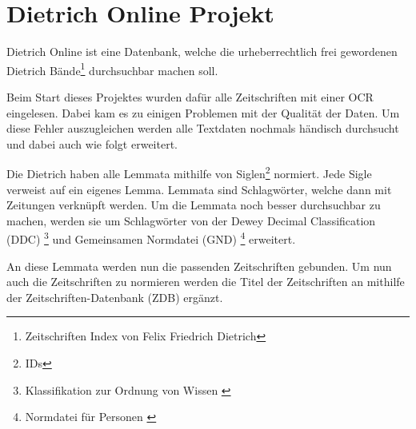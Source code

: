 \chapter{Dietrich Online Projekt}
\label{dietrichonline}

Dietrich Online ist eine Datenbank, welche die urheberrechtlich frei gewordenen Dietrich Bände\footnote{Zeitschriften Index von Felix Friedrich Dietrich} durchsuchbar machen soll. 

Beim Start dieses Projektes wurden dafür alle Zeitschriften mit einer OCR eingelesen. Dabei kam es zu einigen Problemen mit der Qualität der Daten. Um diese Fehler auszugleichen werden alle Textdaten nochmals händisch durchsucht und dabei auch wie folgt erweitert.

Die Dietrich haben alle Lemmata mithilfe von Siglen\footnote{IDs} normiert. Jede Sigle verweist auf ein eigenes Lemma. Lemmata sind Schlagwörter, welche dann mit Zeitungen verknüpft werden. Um die Lemmata noch besser durchsuchbar zu machen, werden sie um Schlagwörter von der Dewey Decimal Classification (DDC)  \footnote{Klassifikation zur Ordnung von Wissen \cite{DeutscheNationalBibliothek.ddc}} und Gemeinsamen Normdatei (GND)  \footnote{Normdatei für Personen \cite{DeutscheNationalBibliothek.2019b}}
erweitert.

An diese Lemmata werden nun die passenden Zeitschriften gebunden. Um nun auch die Zeitschriften zu normieren werden die Titel der Zeitschriften an mithilfe der Zeitschriften-Datenbank (ZDB) ergänzt. 
\cite{UniversityofTrier.2016}